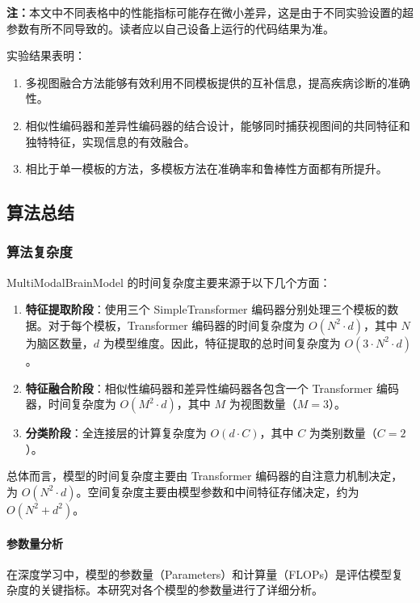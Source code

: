 \documentclass[12pt,a4paper]{article}
\begin{document}
\textbf{注：}本文中不同表格中的性能指标可能存在微小差异，这是由于不同实验设置的超参数有所不同导致的。读者应以自己设备上运行的代码结果为准。

实验结果表明：

\begin{enumerate}
\item 多视图融合方法能够有效利用不同模板提供的互补信息，提高疾病诊断的准确性。
\item 相似性编码器和差异性编码器的结合设计，能够同时捕获视图间的共同特征和独特特征，实现信息的有效融合。
\item 相比于单一模板的方法，多模板方法在准确率和鲁棒性方面都有所提升。
\end{enumerate}

\subsection{算法总结}

\subsubsection{算法复杂度}

MultiModalBrainModel 的时间复杂度主要来源于以下几个方面：

\begin{enumerate}
\item \textbf{特征提取阶段}：使用三个 SimpleTransformer 编码器分别处理三个模板的数据。对于每个模板，Transformer 编码器的时间复杂度为 $O(N^2 \cdot d)$，其中 $N$ 为脑区数量，$d$ 为模型维度。因此，特征提取的总时间复杂度为 $O(3 \cdot N^2 \cdot d)$。

\item \textbf{特征融合阶段}：相似性编码器和差异性编码器各包含一个 Transformer 编码器，时间复杂度为 $O(M^2 \cdot d)$，其中 $M$ 为视图数量（$M=3$）。

\item \textbf{分类阶段}：全连接层的计算复杂度为 $O(d \cdot C)$，其中 $C$ 为类别数量（$C=2$）。
\end{enumerate}

总体而言，模型的时间复杂度主要由 Transformer 编码器的自注意力机制决定，为 $O(N^2 \cdot d)$。空间复杂度主要由模型参数和中间特征存储决定，约为 $O(N^2 + d^2)$。

\paragraph{参数量分析}

在深度学习中，模型的参数量（Parameters）和计算量（FLOPs）是评估模型复杂度的关键指标。本研究对各个模型的参数量进行了详细分析。
\end{document}

